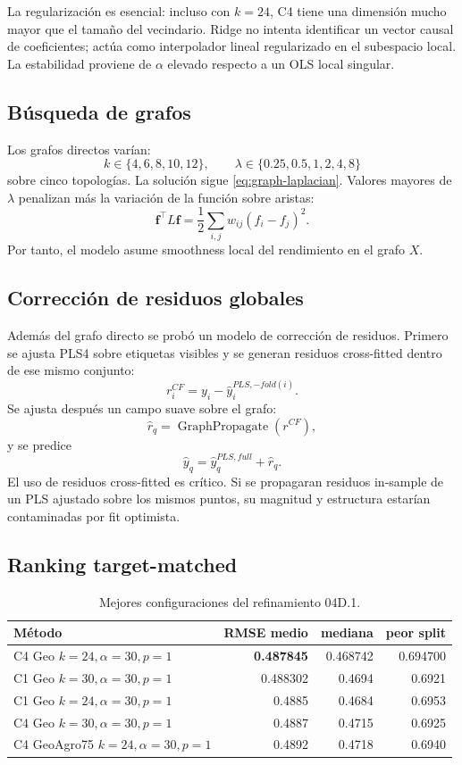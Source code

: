 La regularización es esencial: incluso con $k=24$, C4 tiene una dimensión mucho mayor que el
tamaño del vecindario. Ridge no intenta identificar un vector causal de coeficientes; actúa
como interpolador lineal regularizado en el subespacio local. La estabilidad proviene de
$\alpha$ elevado respecto a un OLS local singular.

\subsection{Búsqueda de grafos}

Los grafos directos varían:
\[
k\in\{4,6,8,10,12\},\qquad
\lambda\in\{0.25,0.5,1,2,4,8\}
\]
sobre cinco topologías. La solución sigue \cref{eq:graph-laplacian}. Valores mayores de
$\lambda$ penalizan más la variación de la función sobre aristas:
\[
\bm f^\top L\bm f
=
\frac{1}{2}\sum_{i,j}w_{ij}(f_i-f_j)^2.
\]
Por tanto, el modelo asume smoothness local del rendimiento en el grafo $X$.

\subsection{Corrección de residuos globales}

Además del grafo directo se probó un modelo de corrección de residuos. Primero se ajusta PLS4
sobre etiquetas visibles y se generan residuos cross-fitted dentro de ese mismo conjunto:
\[
r_i^{CF}
=
y_i-\hat y_i^{PLS,-fold(i)}.
\]
Se ajusta después un campo suave sobre el grafo:
\[
\hat r_q
=
\operatorname{GraphPropagate}(r^{CF}),
\]
y se predice
\[
\hat y_q
=
\hat y_q^{PLS,full}+\hat r_q.
\]
El uso de residuos cross-fitted es crítico. Si se propagaran residuos in-sample de un PLS
ajustado sobre los mismos puntos, su magnitud y estructura estarían contaminadas por fit
optimista.

\subsection{Ranking target-matched}

\begin{table}[H]
\centering
\caption{Mejores configuraciones del refinamiento 04D.1.}
\label{tab:cp04d-ranking}
\small
\begin{tabular}{lrrr}
\toprule
Método & RMSE medio & mediana & peor split \\
\midrule
C4 Geo $k=24,\alpha=30,p=1$ & \textbf{0.487845} & 0.468742 & 0.694700 \\
C1 Geo $k=30,\alpha=30,p=1$ & 0.488302 & 0.4694 & 0.6921 \\
C1 Geo $k=24,\alpha=30,p=1$ & 0.4885 & 0.4684 & 0.6953 \\
C4 Geo $k=30,\alpha=30,p=1$ & 0.4887 & 0.4715 & 0.6925 \\
C4 GeoAgro75 $k=24,\alpha=30,p=1$ & 0.4892 & 0.4718 & 0.6940 \\
\bottomrule
\end{tabular}
\end{table}

